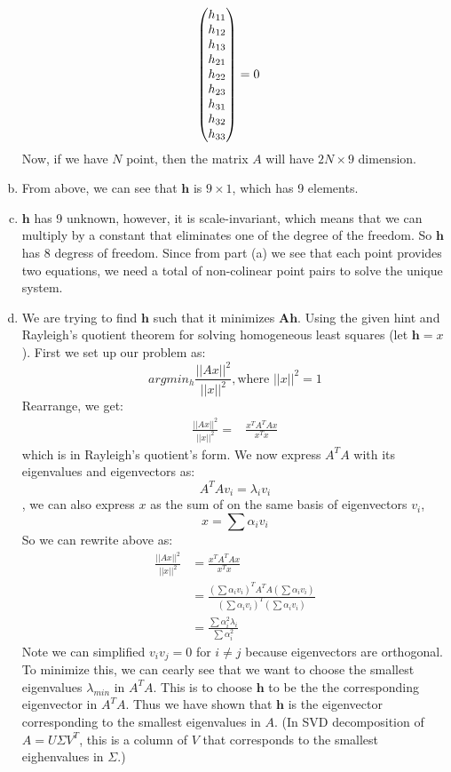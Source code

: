 \documentclass[12pt,letterpaper,boxed]{hmcpset}
\begin{document}
\begin{solution}
\begin{enumerate}[(a)]
\begin{align*}
     \begin{pmatrix}
      h_{11} \cr
      h_{12} \cr
      h_{13} \cr
      h_{21} \cr
      h_{22} \cr
      h_{23} \cr
      h_{31} \cr
      h_{32} \cr
      h_{33} \cr
      \end{pmatrix} & = 0
  \end{align*}
  Now, if we have $N$ point, then the matrix $A$ will have $2N \times 9$ dimension.
  \item From above, we can see that $\mathbf{h}$ is $9\times 1$, which has 9 elements.
  \item $\mathbf{h}$ has 9 unknown, however, it is scale-invariant, which means 
  that we can multiply by a constant that eliminates one of the degree of the freedom. So $\mathbf{h}$ has 
  8 degress of freedom. Since from part (a) we see that each point provides two equations, we need a total 
  of  non-colinear point pairs to solve the unique system.
  \item We are trying to find $\mathbf{h}$ such that it minimizes $\mathbf{Ah}$. Using the given hint and
  Rayleigh's quotient theorem for solving homogeneous least squares (let $\mathbf{h} = x$). First we set up
  our problem as:
  \[
      argmin_{h} \frac{||Ax||^2}{||x||^2}, \text{where $||x||^2 = 1$}
  \]
  Rearrange, we get:
  \begin{align*}
   \frac{||Ax||^2}{||x||^2} = &\frac{x^TA^T Ax}{x^Tx}
  \end{align*}
  which is in Rayleigh's quotient's form. We now express $A^TA$ with its eigenvalues and eigenvectors as:
  \[
    A^TAv_i = \lambda_iv_i
  \], we can also express $x$ as the sum of on the same basis of eigenvectors $v_i$,
  \[
    x=\sum \alpha_i v_i
  \]
  So we can rewrite above as:
  \begin{align*}
   \frac{||Ax||^2}{||x||^2} &= \frac{x^TA^T Ax}{x^Tx} \\
    & = \frac{(\sum \alpha_i v_i)^TA^T A(\sum \alpha_i v_i)}{(\sum \alpha_i v_i)^T(\sum \alpha_i v_i)}\\
    & = \frac{\sum \alpha_i^2 \lambda_i}{\sum \alpha_i^2}
  \end{align*}
  Note we can simplified $v_iv_j = 0$ for $i \not = j$ because eigenvectors are orthogonal. To minimize this, we can cearly see that we want to choose the smallest
  eigenvalues $\lambda_{min}$ in $A^TA$. This is to choose $\mathbf{h}$ to be the the corresponding eigenvector in $A^TA$.
  Thus we have shown that $\mathbf{h}$ is the eigenvector corresponding to the smallest eigenvalues in $A$. (In SVD decomposition of $A = U \Sigma V^T$, this is a column of $V$ that corresponds to the smallest eighenvalues in $\Sigma$.)

\end{enumerate}
\end{solution}
\end{document}
